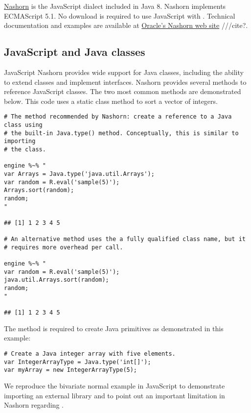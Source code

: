 \href{https://docs.oracle.com/javase/8/docs/technotes/guides/scripting/nashorn/}{Nashorn} is the JavaScript dialect included in Java 8. Nashorn implements ECMAScript 5.1. No download is required to use JavaScript with . Technical documentation and examples are available at \href{https://docs.oracle.com/javase/8/docs/technotes/guides/scripting/nashorn/}{Oracle's Nashorn web site} ///cite?.

\subsection{JavaScript and Java classes}

JavaScript Nashorn provides wide support for Java classes, including the ability to extend classes and implement interfaces. Nashorn provides several methods to reference JavaScript classes. The two most common methods are demonstrated below. This code uses a static class method to sort a vector of integers.

\begin{verbatim}
# The method recommended by Nashorn: create a reference to a Java class using
# the built-in Java.type() method. Conceptually, this is similar to importing
# the class.

engine %~% "
var Arrays = Java.type('java.util.Arrays');
var random = R.eval('sample(5)');
Arrays.sort(random);
random;
"

## [1] 1 2 3 4 5

# An alternative method uses the a fully qualified class name, but it
# requires more overhead per call.

engine %~% "
var random = R.eval('sample(5)');
java.util.Arrays.sort(random);
random;
"

## [1] 1 2 3 4 5
\end{verbatim}

The  method is required to create Java primitives as demonstrated in this example:

\begin{verbatim}
# Create a Java integer array with five elements.
var IntegerArrayType = Java.type('int[]');
var myArray = new IntegerArrayType(5); 
\end{verbatim}

We reproduce the bivariate normal example in JavaScript to demonstrate importing an external library and to point out an important limitation in Nashorn regarding .

